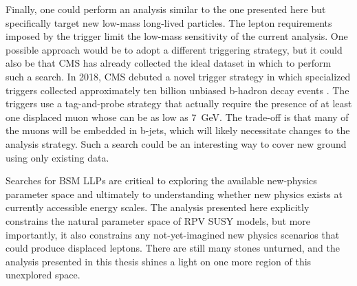 Finally, one could perform an analysis similar to the one presented here but specifically target new low-mass long-lived particles. The lepton \pt requirements imposed by the trigger limit the low-mass sensitivity of the current analysis. One possible approach would be to adopt a different triggering strategy, but it could also be that CMS has already collected the ideal dataset in which to perform such a search. In 2018, CMS debuted a novel trigger strategy in which specialized triggers collected approximately ten billion unbiased b-hadron decay events \cite{cms_b_parking}. The triggers use a tag-and-probe strategy that actually require the presence of at least one displaced muon whose \pt can be as low as \SI{7}{\GeV}. The trade-off is that many of the muons will be embedded in b-jets, which will likely necessitate changes to the analysis strategy. Such a search could be an interesting way to cover new ground using only existing data.

Searches for BSM LLPs are critical to exploring the available new-physics parameter space and ultimately to understanding whether new physics exists at currently accessible energy scales. The analysis presented here explicitly constrains the natural parameter space of RPV SUSY models, but more importantly, it also constrains any not-yet-imagined new physics scenarios that could produce displaced leptons. There are still many stones unturned, and the analysis presented in this thesis shines a light on one more region of this unexplored space.

\pagebreak
